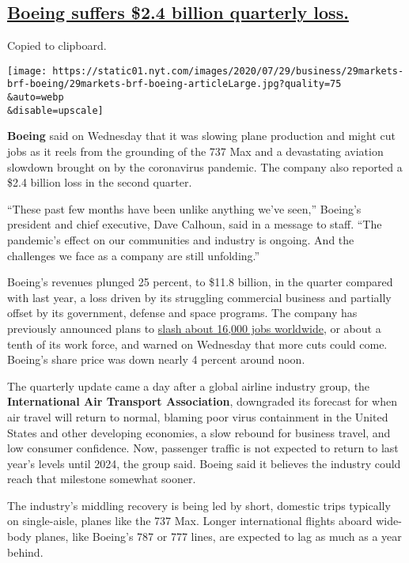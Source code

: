 \hypertarget{boeing-suffers-24-billion-quarterly-loss}{%
\subsection{\texorpdfstring{\protect\hyperlink{boeing-suffers-2-4-billion-quarterly-loss}{Boeing
suffers \$2.4 billion quarterly
loss.}}{Boeing suffers \$2.4 billion quarterly loss.}}\label{boeing-suffers-24-billion-quarterly-loss}}

Copied to clipboard.

\texttt{[image: https://static01.nyt.com/images/2020/07/29/business/29markets-brf-boeing/29markets-brf-boeing-articleLarge.jpg?quality=75\\\&auto=webp\\\&disable=upscale]}

\textbf{Boeing} said on Wednesday that it was slowing plane production
and might cut jobs as it reels from the grounding of the 737 Max and a
devastating aviation slowdown brought on by the coronavirus pandemic.
The company also reported a \$2.4 billion loss in the second quarter.

``These past few months have been unlike anything we've seen,'' Boeing's
president and chief executive, Dave Calhoun, said in a message to staff.
``The pandemic's effect on our communities and industry is ongoing. And
the challenges we face as a company are still unfolding.''

Boeing's revenues plunged 25 percent, to \$11.8 billion, in the quarter
compared with last year, a loss driven by its struggling commercial
business and partially offset by its government, defense and space
programs. The company has previously announced plans to
\href{https://www.nytimes.com/2020/04/29/business/boeing-layoffs-coronavirus.html}{slash
about 16,000 jobs worldwide}, or about a tenth of its work force, and
warned on Wednesday that more cuts could come. Boeing's share price was
down nearly 4 percent around noon.

The quarterly update came a day after a global airline industry group,
the \textbf{International Air Transport Association}, downgraded its
forecast for when air travel will return to normal, blaming poor virus
containment in the United States and other developing economies, a slow
rebound for business travel, and low consumer confidence. Now, passenger
traffic is not expected to return to last year's levels until 2024, the
group said. Boeing said it believes the industry could reach that
milestone somewhat sooner.

The industry's middling recovery is being led by short, domestic trips
typically on single-aisle, planes like the 737 Max. Longer international
flights aboard wide-body planes, like Boeing's 787 or 777 lines, are
expected to lag as much as a year behind.

